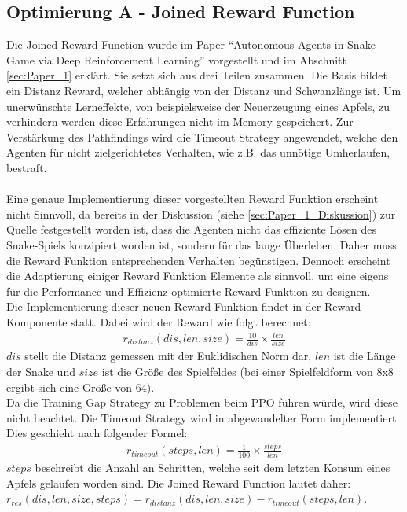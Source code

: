 \subsection{Optimierung A - Joined Reward Function} \label{sec:Konzept_Optimierung01}
Die Joined Reward Function wurde im Paper "`Autonomous Agents in Snake Game via Deep Reinforcement Learning"' \cite{Autonomous_Agents_in_Snake_Game_via_DRL} vorgestellt und im Abschnitt \ref{sec:Paper_1} erklärt. Sie setzt sich aus drei Teilen zusammen. Die Basis bildet ein Distanz Reward, welcher abhängig von der Distanz und Schwanzlänge ist. Um unerwünschte Lerneffekte, von beispielsweise der Neuerzeugung eines Apfels, zu verhindern werden diese Erfahrungen nicht im Memory gespeichert. Zur Verstärkung des Pathfindings wird die Timeout Strategy angewendet, welche den Agenten für nicht zielgerichtetes Verhalten, wie z.B. das unnötige Umherlaufen, bestraft.\\
\\Eine genaue Implementierung dieser vorgestellten Reward Funktion erscheint nicht Sinnvoll, da bereits in der Diskussion (siehe \ref{sec:Paper_1_Diskussion}) zur Quelle \cite{Autonomous_Agents_in_Snake_Game_via_DRL} festgestellt worden ist, dass die Agenten nicht das effiziente Lösen des Snake-Spiels konzipiert worden ist, sondern für das lange Überleben. Daher muss die Reward Funktion entsprechenden Verhalten begünstigen. Dennoch erscheint die Adaptierung einiger Reward Funktion Elemente als sinnvoll, um eine eigens für die Performance und Effizienz optimierte Reward Funktion zu designen.\\
Die Implementierung dieser neuen Reward Funktion findet in der Reward-Komponente statt. Dabei wird der Reward wie folgt berechnet:
\begin{align}
	r_{distanz}(dis, len, size) = \frac{10}{dis} \times \frac{len}{size}
\end{align}
$dis$ stellt die Distanz gemessen mit der Euklidischen Norm dar, $len$ ist die Länge der Snake und $size$ ist die Größe des Spielfeldes (bei einer Spielfeldform von 8x8 ergibt sich eine Größe von 64).\\ Da die Training Gap Strategy zu Problemen beim PPO führen würde, wird diese nicht beachtet. Die Timeout Strategy wird in abgewandelter Form implementiert. Dies geschieht nach folgender Formel:
\begin{align}
	r_{timeout}(steps, len) = \frac{1}{100} \times \frac{steps}{len}
\end{align}
$steps$ beschreibt die Anzahl an Schritten, welche seit dem letzten Konsum eines Apfels gelaufen worden sind. 
Die Joined Reward Function lautet daher: $r_{res}(dis, len, size, steps) = 	r_{distanz}(dis, len, size) - r_{timeout}(steps, len)$.

